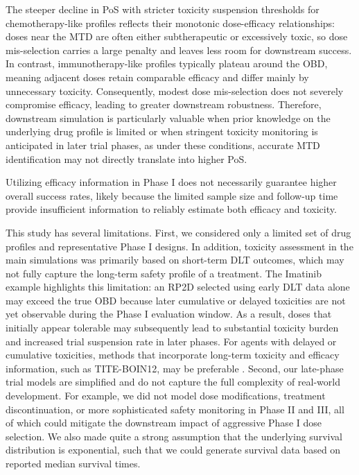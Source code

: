 \documentclass[11pt]{article}
\begin{document}
The steeper decline in PoS with stricter toxicity suspension thresholds for chemotherapy-like profiles reflects their monotonic dose-efficacy relationships: doses near the MTD are often either subtherapeutic or excessively toxic, so dose mis-selection carries a large penalty and leaves less room for downstream success. In contrast, immunotherapy-like profiles typically plateau around the OBD, meaning adjacent doses retain comparable efficacy and differ mainly by unnecessary toxicity. Consequently, modest dose mis-selection does not severely compromise efficacy, leading to greater downstream robustness. Therefore, downstream simulation is particularly valuable when prior knowledge on the underlying drug profile is limited or when stringent toxicity monitoring is anticipated in later trial phases, as under these conditions, accurate MTD identification may not directly translate into higher PoS. 

Utilizing efficacy information in Phase I does not necessarily guarantee higher overall success rates, likely because the limited sample size and follow-up time provide insufficient information to reliably estimate both efficacy and toxicity. 

This study has several limitations. First, we considered only a limited set of drug profiles and representative Phase I designs. In addition, toxicity assessment in the main simulations was primarily based on short-term DLT outcomes, which may not fully capture the long-term safety profile of a treatment. The Imatinib example highlights this limitation: an RP2D selected using early DLT data alone may exceed the true OBD because later cumulative or delayed toxicities are not yet observable during the Phase I evaluation window. As a result, doses that initially appear tolerable may subsequently lead to substantial toxicity burden and increased trial suspension rate in later phases. For agents with delayed or cumulative toxicities, methods that incorporate long-term toxicity and efficacy information, such as TITE-BOIN12, may be preferable \parencite{TITE-BOIN12}. Second, our late-phase trial models are simplified and do not capture the full complexity of real-world development. For example, we did not model dose modifications, treatment discontinuation, or more sophisticated safety monitoring in Phase II and III, all of which could mitigate the downstream impact of aggressive Phase I dose selection. We also made quite a strong assumption that the underlying survival distribution is exponential, such that we could generate survival data based on reported median survival times.
\end{document}

